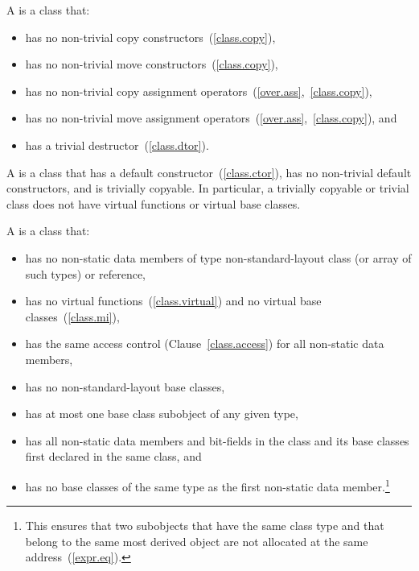 %
%
\pnum
A  is a class that:

\begin{itemize}
\item has no non-trivial copy constructors~(\ref{class.copy}),
\item has no non-trivial move constructors~(\ref{class.copy}),
\item has no non-trivial copy assignment operators~(\ref{over.ass},~\ref{class.copy}),
\item has no non-trivial move assignment operators~(\ref{over.ass},~\ref{class.copy}), and
\item has a trivial destructor~(\ref{class.dtor}).
\end{itemize}

A  is a class that has a default
constructor~(\ref{class.ctor}), has no non-trivial default constructors, and is trivially copyable.
\enternote In particular, a trivially copyable or trivial class does not have
virtual functions or virtual base classes.\exitnote

%
%
\pnum
A  is a class that:

\begin{itemize}
\item has no non-static data members of type non-standard-layout class
(or array of such types) or reference,

\item has no virtual functions~(\ref{class.virtual}) and no
virtual base classes~(\ref{class.mi}),

\item has the same access control (Clause~\ref{class.access})
for all non-static data members,

\item has no non-standard-layout base classes,

\item has at most one base class subobject of any given type,

\item has all non-static data members and bit-fields in the class and
its base classes first declared in the same class, and

\item has no base classes of the same type as the first non-static
data member.\footnote{This ensures that two subobjects that have the
same class type and that
belong to the same most derived object are not allocated at the same
address~(\ref{expr.eq}).}
\end{itemize}

